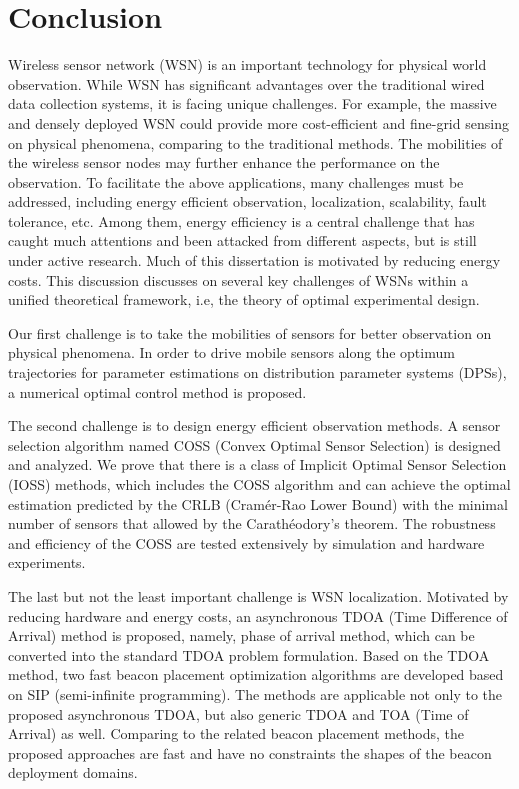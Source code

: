 \chapter{Conclusion}\label{s:dissConclusion}
Wireless sensor network (WSN) is an important technology for physical world observation. While WSN has significant advantages over the traditional wired data collection systems, it is facing unique challenges. For example, the massive and densely deployed WSN could provide more cost-efficient and fine-grid sensing on physical phenomena, comparing to the traditional methods. The mobilities of the wireless sensor nodes may further enhance the performance on the observation. To facilitate the above applications, many challenges must be addressed, including energy efficient observation, localization, scalability, fault tolerance, etc. Among them, energy efficiency is a central challenge that has caught much attentions and been attacked from different aspects, but is still under active research. Much of this dissertation is motivated by reducing energy costs.
    This discussion discusses on several key challenges of WSNs within a unified theoretical framework, i.e, the theory of optimal experimental design.

Our first challenge is to take the mobilities of sensors for better observation on physical phenomena. In order to drive mobile sensors along the optimum trajectories for parameter estimations on distribution parameter systems (DPSs), a numerical optimal control method is proposed.


    The second challenge is to design energy efficient observation methods. A sensor selection algorithm named COSS (Convex Optimal Sensor Selection) is designed and analyzed. We prove that there is a class of Implicit Optimal Sensor Selection (IOSS) methods, which includes the COSS algorithm and can achieve the optimal estimation predicted by the CRLB (Cram\'{e}r-Rao Lower Bound) with the minimal number of sensors that allowed by the Carath\'{e}odory's theorem. The robustness and efficiency of the COSS are tested extensively by simulation and hardware experiments.


        The last but not the least important challenge is WSN localization. Motivated by reducing hardware and energy costs, an asynchronous TDOA (Time Difference of Arrival) method is proposed, namely, phase of arrival method, which can be converted into the standard TDOA problem formulation.
      Based on the TDOA method, two fast beacon placement optimization algorithms are developed based on SIP (semi-infinite programming). The methods are applicable not only to the proposed asynchronous TDOA, but also generic TDOA and TOA (Time of Arrival) as well. Comparing to the related beacon placement methods, the proposed approaches are fast and have no constraints the shapes of the beacon deployment domains.


